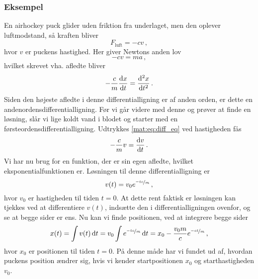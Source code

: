 \subsubsection{Eksempel}
En airhockey puck glider uden friktion fra underlaget, men den oplever luftmodstand, så kraften bliver
\begin{equation*}
    F_\text{luft}=-cv \, ,
\end{equation*}
hvor $v$ er puckens hastighed. Her giver Newtons anden lov
\begin{equation}
-cv=ma \, ,
\end{equation}
hvilket skrevet vha. afledte bliver
\begin{equation} \label{mat:eq:diff_eq}
 -\frac{c}{m}\dv{x}{t} = \dv[2]{x}{t} \, .
\end{equation}
Siden den højeste afledte i denne differentialligning er af anden orden, er dette en andenordensdifferentialligning.
Før vi går videre med denne og prøver at finde en løsning, slår vi lige koldt vand i blodet og starter med en førsteordensdifferentialligning. Udtrykkes \cref{mat:eq:diff_eq} ved hastigheden fås
\begin{equation}
-\frac{c}{m}v=\dv{v}{t} \, .
\end{equation}
Vi har nu brug for en funktion, der er sin egen afledte, hvilket eksponentialfunktionen er. Løsningen til denne differentialligning er
\begin{equation}
v(t)=v_0e^{\nicefrac{-tc}{m}} \, ,
\end{equation}
hvor $v_0$ er hastigheden til tiden $t=0$. At dette rent faktisk er løsningen kan tjekkes ved at differentiere $v(t)$, indsætte den i differentialligningen ovenfor, og se at begge sider er ens.
Nu kan vi finde positionen, ved at integrere begge sider
\begin{equation}
x(t)= \int v(t) \dd{t} = v_0\int e^{\nicefrac{-tc}{m}}\dd{t}=x_0-\frac{v_0m}{c}e^{\nicefrac{-ct}{m}} \, ,
\end{equation}
hvor $x_0$ er positionen til tiden $t=0$. På denne måde har vi fundet ud af, hvordan puckens position ændrer sig, hvis vi kender startpositionen $x_0$ og starthastigheden $v_0$.\\

